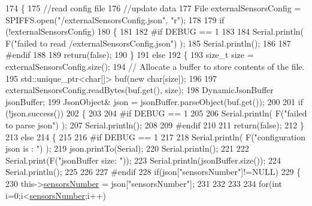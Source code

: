 \begin{DoxyCode}
174 \{
175     \textcolor{comment}{//read config file}
176     \textcolor{comment}{//update data}
177     File externalSensorsConfig = SPIFFS.open(\textcolor{stringliteral}{"/externalSensorsConfig.json"}, \textcolor{stringliteral}{"r"});
178 
179     \textcolor{keywordflow}{if} (!externalSensorsConfig) 
180     \{
181     
182 \textcolor{preprocessor}{    #if DEBUG == 1}
183         
184         Serial.println( F(\textcolor{stringliteral}{"failed to read /externalSensorsConfig.json"}) );
185         Serial.println();
186     
187 \textcolor{preprocessor}{    #endif}
188         
189         \textcolor{keywordflow}{return}(\textcolor{keyword}{false});
190     \}
191     \textcolor{keywordflow}{else}
192     \{
193         \textcolor{keywordtype}{size\_t} size = externalSensorsConfig.size();
194         \textcolor{comment}{// Allocate a buffer to store contents of the file.}
195         std::unique\_ptr<char[]> buf(\textcolor{keyword}{new} \textcolor{keywordtype}{char}[size]);
196 
197         externalSensorsConfig.readBytes(buf.get(), size);
198         DynamicJsonBuffer jsonBuffer;
199         JsonObject& json = jsonBuffer.parseObject(buf.get());
200 
201         \textcolor{keywordflow}{if} (!json.success()) 
202         \{
203         
204 \textcolor{preprocessor}{        #if DEBUG == 1 }
205 
206             Serial.println( F(\textcolor{stringliteral}{"failed to parse json"}) );
207             Serial.println();
208         
209 \textcolor{preprocessor}{        #endif}
210 
211             \textcolor{keywordflow}{return}(\textcolor{keyword}{false});
212         \} 
213         \textcolor{keywordflow}{else}
214         \{
215         
216 \textcolor{preprocessor}{        #if DEBUG == 1 }
217     
218             Serial.println( F(\textcolor{stringliteral}{"configuration json is : "}) );
219             json.printTo(Serial);
220             Serial.println();
221 
222             Serial.print(F(\textcolor{stringliteral}{"jsonBuffer size: "}));
223             Serial.println(jsonBuffer.size());
224             Serial.println();
225 
226         
227 \textcolor{preprocessor}{        #endif          }
228             \textcolor{keywordflow}{if}(json[\textcolor{stringliteral}{"sensorsNumber"}]!=NULL)
229             \{
230                 this->\hyperlink{class_external_sensors_a58e4fbf9adeae787d92be5fa33043b5d}{sensorsNumber} = json[\textcolor{stringliteral}{"sensorsNumber"}];
231                 
232                 
233 
234                 \textcolor{keywordflow}{for}(\textcolor{keywordtype}{int} i=0;i<\hyperlink{class_external_sensors_a58e4fbf9adeae787d92be5fa33043b5d}{sensorsNumber};i++)

\end{DoxyCode}
